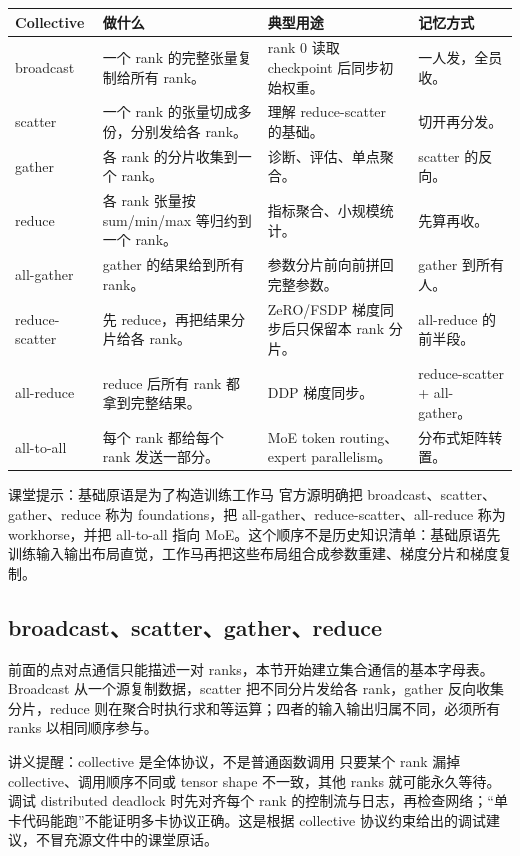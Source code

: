 \documentclass[a4paper]{article}
\begin{document}
\begin{longtable}{L{0.16\textwidth}L{0.26\textwidth}L{0.26\textwidth}L{0.16\textwidth}}
\toprule
Collective & 做什么 & 典型用途 & 记忆方式 \\
\midrule
\endhead
broadcast & 一个 rank 的完整张量复制给所有 rank。 & rank 0 读取 checkpoint 后同步初始权重。 & 一人发，全员收。 \\
scatter & 一个 rank 的张量切成多份，分别发给各 rank。 & 理解 reduce-scatter 的基础。 & 切开再分发。 \\
gather & 各 rank 的分片收集到一个 rank。 & 诊断、评估、单点聚合。 & scatter 的反向。 \\
reduce & 各 rank 张量按 sum/min/max 等归约到一个 rank。 & 指标聚合、小规模统计。 & 先算再收。 \\
all-gather & gather 的结果给到所有 rank。 & 参数分片前向前拼回完整参数。 & gather 到所有人。 \\
reduce-scatter & 先 reduce，再把结果分片给各 rank。 & ZeRO/FSDP 梯度同步后只保留本 rank 分片。 & all-reduce 的前半段。 \\
all-reduce & reduce 后所有 rank 都拿到完整结果。 & DDP 梯度同步。 & reduce-scatter + all-gather。 \\
all-to-all & 每个 rank 都给每个 rank 发送一部分。 & MoE token routing、expert parallelism。 & 分布式矩阵转置。 \\
\bottomrule
\end{longtable}

\begin{knowledgebox}{课堂提示：基础原语是为了构造训练工作马}
官方源明确把 broadcast、scatter、gather、reduce 称为 foundations，把 all-gather、reduce-scatter、all-reduce 称为 workhorse，并把 all-to-all 指向 MoE。这个顺序不是历史知识清单：基础原语先训练输入输出布局直觉，工作马再把这些布局组合成参数重建、梯度分片和梯度复制。
\end{knowledgebox}

\subsection{broadcast、scatter、gather、reduce}

前面的点对点通信只能描述一对 ranks，本节开始建立集合通信的基本字母表。Broadcast 从一个源复制数据，scatter 把不同分片发给各 rank，gather 反向收集分片，reduce 则在聚合时执行求和等运算；四者的输入输出归属不同，必须所有 ranks 以相同顺序参与。

\begin{knowledgebox}{讲义提醒：collective 是全体协议，不是普通函数调用}
只要某个 rank 漏掉 collective、调用顺序不同或 tensor shape 不一致，其他 ranks 就可能永久等待。调试 distributed deadlock 时先对齐每个 rank 的控制流与日志，再检查网络；“单卡代码能跑”不能证明多卡协议正确。这是根据 collective 协议约束给出的调试建议，不冒充源文件中的课堂原话。
\end{knowledgebox}
\end{document}
